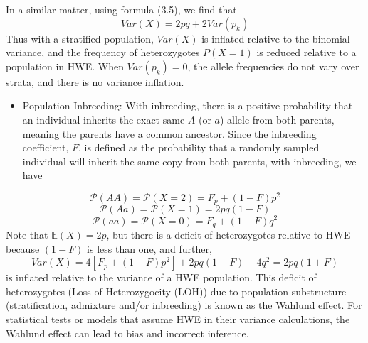 \documentclass[a4paper,twoside,11pt]{article}
\begin{document}
In a similar matter, using formula (3.5), we find that
$$
Var(X) = 2pq + 2 Var(p_k)
$$
Thus with a stratified population, $Var(X)$ is inflated relative to the binomial variance, and the frequency of heterozygotes $P(X = 1)$ is reduced relative to a population in HWE. When $Var(p_k) = 0$, the allele frequencies do not vary over strata, and there is no variance inflation.
\begin{itemize}
    \item \textcolor{NavyBlue}{Population Inbreeding: }With inbreeding, there is a positive probability that an individual inherits the exact same $A$ (or $a$) allele from both parents, meaning the parents have a common ancestor. Since the inbreeding coefficient, $F$, is defined as the probability that a randomly sampled individual will inherit the same copy from both parents, with inbreeding, we have
\end{itemize}
$$
\mathcal{P}(AA) = \mathcal{P}(X=2) = F_p+ (1-F)p^2
$$
$$
\mathcal{P}(Aa) = \mathcal{P}(X=1) = 2pq(1-F)
$$
$$
\mathcal{P}(aa) = \mathcal{P}(X=0) = F_q+ (1-F)q^2
$$
Note that $\mathbb{E}(X)=2p$, but there is a deficit of heterozygotes relative to HWE because $(1-F)$ is less than one, and further,
$$
Var(X) = 4[F_p+(1-F)p^2]+2pq (1-F)-4q^2 = 2pq(1+F)
$$
is inflated relative to the variance of a HWE population. This deficit of heterozygotes (Loss of Heterozygocity (LOH)) due to population substructure (stratification, admixture and/or inbreeding) is known as the Wahlund effect. For statistical tests or models that assume HWE in their variance calculations, the Wahlund effect can lead to bias and incorrect inference.
\end{document}
